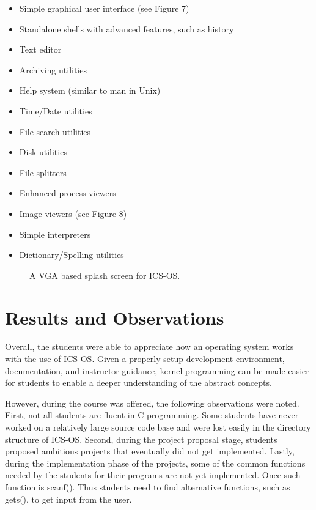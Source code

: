 \documentclass{acm_proc_article-sp}
\begin{document}
\begin{itemize}
\item{Simple graphical user interface (see Figure 7)}
\item{Standalone shells with advanced features, such as history}
\item{Text editor}
\item{Archiving utilities}
\item{Help system (similar to man in Unix)}
\item{Time/Date utilities}
\item{File search utilities}
\item{Disk utilities}
\item{File splitters}
\item{Enhanced process viewers}
\item{Image viewers (see Figure 8)}
\item{Simple interpreters}
\item{Dictionary/Spelling utilities}
\end{itemize}

\begin{figure}
\centering
{}
\caption{A VGA based splash screen for ICS-OS.}
\end{figure}



\section{Results and Observations}
Overall, the students were able to appreciate how an operating system works
with the use of ICS-OS. Given a properly setup development environment, 
documentation, and instructor guidance, kernel programming can be made easier
for students to enable a deeper understanding of the abstract concepts. 

However, during the course was offered, the following observations were noted.
First, not all students are fluent in C programming. Some students have never
worked on a relatively large source code base and were lost easily in the 
directory structure of ICS-OS. Second, during the project proposal stage,
students proposed ambitious projects that eventually did not get implemented.
Lastly, during the implementation phase of the projects, some of the 
common functions needed by the students for their programs are not yet
implemented. Once such function is scanf(). Thus students need to find
alternative functions, such as gets(), to get input from the user.
\end{document}
